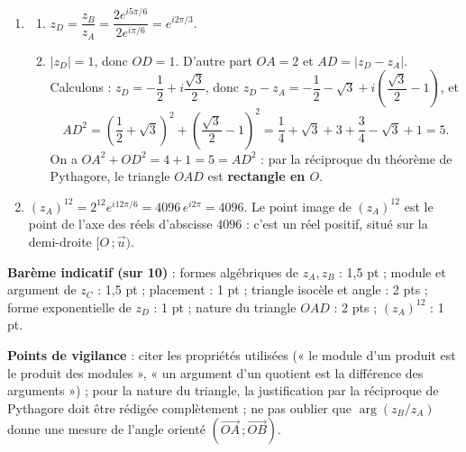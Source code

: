 \documentclass[11pt]{article}
\providecommand{\degree}{^{\circ}}
\begin{document}
\begin{corrige}
\begin{enumerate}
Une mesure de $\widehat{AOB}$ est :
\[ \arg\left(\frac{z_B}{z_A}\right) = \arg(z_B) - \arg(z_A) = \frac{5\pi}{6} - \frac{\pi}{6} = \frac{4\pi}{6} = \frac{2\pi}{3}. \]
Donc $\widehat{AOB} = \dfrac{2\pi}{3}$ rad, soit $120\degree$.
\item \begin{enumerate}
\item $z_D = \dfrac{z_B}{z_A} = \dfrac{2e^{i5\pi/6}}{2e^{i\pi/6}} = e^{i2\pi/3}$.
\item $|z_D| = 1$, donc $OD = 1$. D'autre part $OA = 2$ et $AD = |z_D - z_A|$. Calculons : $z_D = -\dfrac{1}{2} + i\dfrac{\sqrt{3}}{2}$, donc $z_D - z_A = -\dfrac{1}{2} - \sqrt{3} + i\left(\dfrac{\sqrt{3}}{2} - 1\right)$, et
\[ AD^2 = \left(\frac{1}{2} + \sqrt{3}\right)^2 + \left(\frac{\sqrt{3}}{2} - 1\right)^2 = \frac{1}{4} + \sqrt{3} + 3 + \frac{3}{4} - \sqrt{3} + 1 = 5. \]
On a $OA^2 + OD^2 = 4 + 1 = 5 = AD^2$ : par la réciproque du théorème de Pythagore, le triangle $OAD$ est \textbf{rectangle en $O$}.
\end{enumerate}
\item $(z_A)^{12} = 2^{12}e^{i12\pi/6} = 4096\,e^{i2\pi} = 4096$. Le point image de $(z_A)^{12}$ est le point de l'axe des réels d'abscisse $4096$ : c'est un réel positif, situé sur la demi-droite $[O\,;\vec{u})$.
\end{enumerate}

\textbf{Barème indicatif (sur 10)} : formes algébriques de $z_A, z_B$ : 1,5 pt ; module et argument de $z_C$ : 1,5 pt ; placement : 1 pt ; triangle isocèle et angle : 2 pts ; forme exponentielle de $z_D$ : 1 pt ; nature du triangle $OAD$ : 2 pts ; $(z_A)^{12}$ : 1 pt.

\textbf{Points de vigilance} : citer les propriétés utilisées (« le module d'un produit est le produit des modules », « un argument d'un quotient est la différence des arguments ») ; pour la nature du triangle, la justification par la réciproque de Pythagore doit être rédigée complètement ; ne pas oublier que $\arg(z_B/z_A)$ donne une mesure de l'angle orienté $(\overrightarrow{OA}\,;\overrightarrow{OB})$.
\end{corrige}
\end{document}
